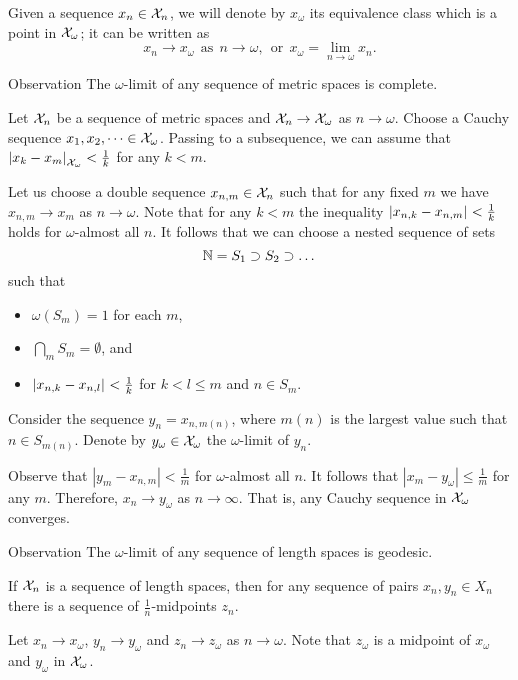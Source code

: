 Given a sequence $x_n\in \mathcal{X}_n$,
we will denote by $x_\omega$ its equivalence class which is a point in $\mathcal{X}_\omega$;
it can be written as
\[x_n\to x_\omega \ \ \text{as}\ \  n\to\omega,\ \ \text{or}\ \ x_\omega=\lim_{n\to\omega} x_n.\]

\begin{thm}{Observation}\label{obs:ultralimit-is-complete}
The $\omega$-limit of any sequence of metric spaces is complete. 
\end{thm}

Let $\mathcal{X}_n$ be a sequence of metric spaces and $\mathcal{X}_n\to\mathcal{X}_\omega$ as $n\to\omega$.
Choose a Cauchy sequence $x_1,x_2,\dots\in\mathcal{X}_\omega$.
Passing to a subsequence, we can assume that $\dist{x_k}{x_{m}}{\spc{X}_\omega}<\tfrac1{k}$ for any $k<m$.

Let us choose a double sequence $x_{n,m}\in \mathcal{X}_n$ such that for any fixed $m$ we have $x_{n,m}\to x_m$ as $n\to\omega$.
Note that for any $k<m$ the inequality $\dist{x_{n,k}}{x_{n,m}}{}<\tfrac1{k}$ holds for $\omega$-almost all $n$.
It follows that we can choose a nested sequence of sets 
\[\mathbb{N}= S_1\supset S_2\supset\dots\] 
such that 
\begin{itemize}
\item $\omega(S_m)=1$ for each $m$, 
\item $\bigcap_m S_m=\emptyset$, and
\item $\dist{x_{n,k}}{x_{n,l}}{}<\tfrac1{k}$ for $k<l\le m$ and $n\in S_m$.
\end{itemize}

Consider the sequence $y_n=x_{n,m(n)}$, where $m(n)$ is the largest value such that $n\in S_{m(n)}$.
Denote by $y_\omega\in \mathcal{X}_\omega$ the $\omega$-limit of $y_n$.

Observe that $|y_m-x_{n,m}|<\tfrac1{m}$ for $\omega$-almost all $n$.
It follows that $|x_m-y_\omega|\le \tfrac1{m}$ for any $m$.
Therefore, $x_n\to y_\omega$ as $n\to \infty$.
That is, any Cauchy sequence in $\mathcal{X}_\omega$ converges.
\qeds

\begin{thm}{Observation}\label{obs:ultralimit-is-geodesic}
The $\omega$-limit of any sequence of length spaces is geodesic. 
\end{thm}

If $\mathcal{X}_n$ is a sequence of length spaces, then for any sequence of pairs $x_n, y_n\in X_n$ there is a sequence of $\tfrac1n$-midpoints $z_n$.

Let $x_n\to x_\omega$, $y_n\to y_\omega$ and $z_n\to z_\omega$ as $n\to \omega$.
Note that $z_\omega$ is a midpoint of $x_\omega$ and $y_\omega$ in $\mathcal{X}_\omega$.

